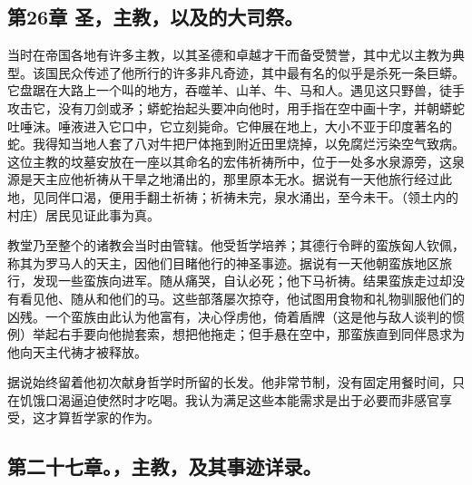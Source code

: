 
\subsection{第26章 圣，主教，以及的大司祭。}

当时在帝国各地有许多主教，以其圣德和卓越才干而备受赞誉，其中尤以主教为典型。该国民众传述了他所行的许多非凡奇迹，其中最有名的似乎是杀死一条巨蟒。它盘踞在大路上一个叫的地方，吞噬羊、山羊、牛、马和人。遇见这只野兽，徒手攻击它，没有刀剑或矛；蟒蛇抬起头要冲向他时，用手指在空中画十字，并朝蟒蛇吐唾沫。唾液进入它口中，它立刻毙命。它伸展在地上，大小不亚于印度著名的蛇。我得知当地人套了八对牛把尸体拖到附近田里烧掉，以免腐烂污染空气致病。这位主教的坟墓安放在一座以其命名的宏伟祈祷所中，位于一处多水泉源旁，这泉源是天主应他祈祷从干旱之地涌出的，那里原本无水。据说有一天他旅行经过此地，见同伴口渴，便用手翻土祈祷；祈祷未完，泉水涌出，至今未干。（领土内的村庄）居民见证此事为真。\par

教堂乃至整个的诸教会当时由管辖。他受哲学培养；其德行令畔的蛮族匈人钦佩，称其为罗马人的天主，因他们目睹他行的神圣事迹。据说有一天他朝蛮族地区旅行，发现一些蛮族向进军。随从痛哭，自认必死；他下马祈祷。结果蛮族走过却没有看见他、随从和他们的马。这些部落屡次掠夺，他试图用食物和礼物驯服他们的凶残。一个蛮族由此认为他富有，决心俘虏他，倚着盾牌（这是他与敌人谈判的惯例）举起右手要向他抛套索，想把他拖走；但手悬在空中，那蛮族直到同伴恳求为他向天主代祷才被释放。\par

据说始终留着他初次献身哲学时所留的长发。他非常节制，没有固定用餐时间，只在饥饿口渴逼迫使然时才吃喝。我认为满足这些本能需求是出于必要而非感官享受，这才算哲学家的作为。\par


\subsection{第二十七章。，主教，及其事迹详录。}

